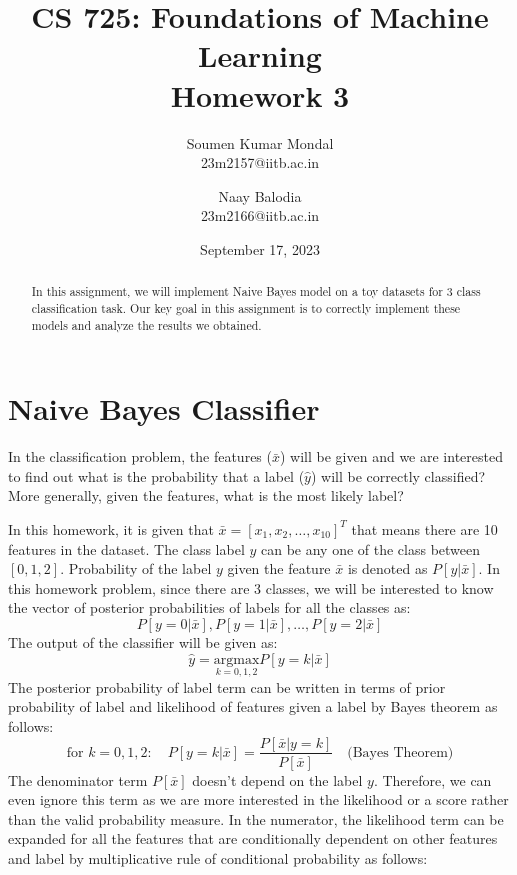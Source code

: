 \documentclass[12pt, a4paper, twoside]{article}
\title{\vspace{-0.5in}\textbf{CS 725: Foundations of Machine Learning \\
Homework 3}}
\author{Soumen Kumar Mondal\\
23m2157@iitb.ac.in \and
Naay Balodia\\
23m2166@iitb.ac.in}
\date{September  17, 2023}
\begin{document}
\maketitle
\thispagestyle{fancy}
\begin{abstract}
In this assignment, we will implement Naive Bayes model on a toy datasets for 3 class classification task. Our key goal in this assignment is to correctly implement these models and analyze the results we obtained.
\end{abstract}
\section{Naive Bayes Classifier}\label{S:nb}
In the classification problem, the features ($\bar{x}$) will be given and we are interested to find out what is the probability that a label ($\hat{y}$) will be correctly classified? More generally, given the features, what is the most likely label?
\par
In this homework, it is given that $\bar{x} = [x_1, x_2, \ldots, x_{10}]^T$ that means there are 10 features in the dataset. The class label $y$ can be any one of the class between $[0, 1, 2]$. Probability of the label $y$ given the feature $\bar{x}$ is denoted as $P [y | \bar{x}]$. In this homework problem, since there are 3 classes, we will be interested to know the vector of posterior probabilities of labels for all the classes as:
\begin{equation}
		P [ y = 0 | \bar{x}], P [ y = 1 | \bar{x}], \dots , P [ y = 2 | \bar{x}]
\end{equation}
The output of the classifier will be given as:
\begin{equation}
	\hat{y} = \underset{k = 0, 1, 2}{\text{argmax}} P[ y  = k | \bar{x}] 
\end{equation}
The posterior probability of label term can be written in terms of prior probability of label and likelihood of features given a label by Bayes theorem as follows:
\begin{equation}
	\text{for } k = 0, 1, 2: \quad P [y = k | \bar{x}] = \frac{P [\bar{x} | y = k]}{P [\bar{x}]} \quad \text{(Bayes Theorem)}
\end{equation}
The denominator term $P [\bar{x}]$ doesn't depend on the label $y$. Therefore, we can even ignore this term as we are more interested in the likelihood or a score rather than the valid probability measure. In the numerator, the likelihood term can be expanded for all the features that are conditionally dependent on other features and label by multiplicative rule of conditional probability as follows:
\end{document}
